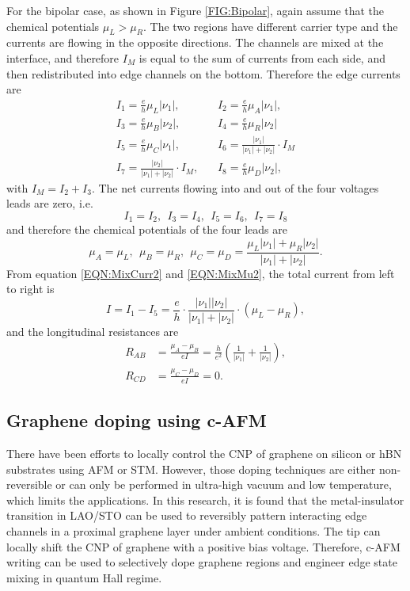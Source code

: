 \documentclass[pdflatex, sectionletters, 12pt]{pittetd}    %
\begin{document}
For the bipolar case, as shown in Figure \ref{FIG:Bipolar}, again assume that the chemical potentials $\mu_L > \mu_R$. The two regions have different carrier type and the currents are flowing in the opposite directions. The channels are mixed at the interface, and therefore $I_M$ is equal to the sum of currents from each side, and then redistributed into edge channels on the bottom. Therefore the edge currents are
\begin{equation}
\label{EQN:MixCurr2}
\begin{split}
I_1 = \frac{e}{h}\mu_L|\nu_1|, & \ \ \ \   I_2 = \frac{e}{h}\mu_A|\nu_1|, \\
I_3 = \frac{e}{h}\mu_B|\nu_2|, & \ \ \ \ I_4 = \frac{e}{h}\mu_R|\nu_2| \\
I_5 = \frac{e}{h}\mu_C|\nu_1|, & \ \ \ \  I_6 = \frac{|\nu_1|}{|\nu_1|+|\nu_2|} \cdot I_M \\
I_7 = \frac{|\nu_2|}{|\nu_1|+|\nu_2|} \cdot I_M, & \ \ \ \ I_8 = \frac{e}{h}\mu_D|\nu_2|,
\end{split}
\end{equation}
with $I_M = I_2 + I_3$. The net currents flowing into and out of the four voltages leads are zero, i.e.
$$
I_1 = I_2, \ \ I_3 = I_4, \ \ I_5 = I_6, \ \ I_7 = I_8
$$
and therefore the chemical potentials of the four leads are
\begin{equation}
\label{EQN:MixMu2}
\mu_A = \mu_L, \ \ \mu_B = \mu_R, \ \ \mu_C = \mu_D = \frac{\mu_L|\nu_1| + \mu_R|\nu_2|}{|\nu_1| + |\nu_2|}.
\end{equation}
From equation \ref{EQN:MixCurr2} and \ref{EQN:MixMu2}, the total current from left to right is 
$$
I = I_1 - I_5 = \frac{e}{h} \cdot \frac{|\nu_1||\nu_2|}{|\nu_1| + |\nu_2|} \cdot (\mu_L - \mu_R),
$$ 
and the longitudinal resistances are 
\begin{equation}
\label{EQN:Mixing2}
\begin{split}
R_{AB} & = \frac{\mu_A - \mu_B}{eI} = \frac{h}{e^2}\left(\frac{1}{|\nu_1|} + \frac{1}{|\nu_2|}\right), \\
R_{CD} & = \frac{\mu_C - \mu_D}{eI} = 0.
\end{split}
\end{equation}

\subsection{Graphene doping using c-AFM}

There have been efforts to locally control the CNP of graphene on silicon or hBN substrates using AFM\cite{schmidt2013mixing} or STM\cite{velasco2016nanoscale}. However, those doping techniques are either non-reversible or can only be performed in ultra-high vacuum and low temperature, which limits the applications. In this research, it is found that the metal-insulator transition in LAO/STO can be used to reversibly pattern interacting edge channels in a proximal graphene layer under ambient conditions. The tip can locally shift the CNP of graphene with a positive bias voltage. Therefore, c-AFM writing can be used to selectively dope graphene regions and engineer edge state mixing in quantum Hall regime.
\end{document}
